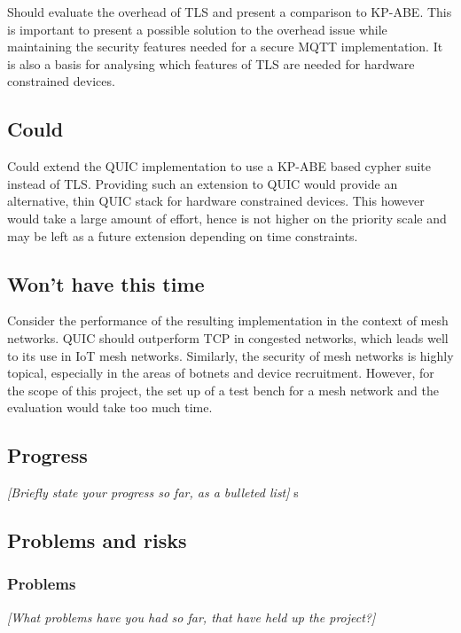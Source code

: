 \documentclass[11pt]{article}
\begin{document}
Should evaluate the overhead of TLS and present a comparison to KP-ABE.
This is important to present a possible solution to the overhead issue while maintaining the security features needed for a secure MQTT implementation.
It is also a basis for analysing which features of TLS are needed for hardware constrained devices.

\subsection*{Could}

Could extend the QUIC implementation to use a KP-ABE based cypher suite instead of TLS.
Providing such an extension to QUIC would provide an alternative, thin QUIC stack for hardware constrained devices.
This however would take a large amount of effort, hence is not higher on the priority scale and may be left as a future extension depending on time constraints.

\subsection*{Won't have this time}

Consider the performance of the resulting implementation in the context of mesh networks.
QUIC should outperform TCP in congested networks, which leads well to its use in IoT mesh networks.
Similarly, the security of mesh networks is highly topical, especially in the areas of botnets and device recruitment.
However, for the scope of this project, the set up of a test bench for a mesh network and the evaluation would take too much time.

\subsection{Progress}\label{progress}

\emph{{[}Briefly state your progress so far, as a bulleted list{]}}
s   
\subsection{Problems and risks}\label{problems-and-risks}

\subsubsection{Problems}\label{problems}

\emph{{[}What problems have you had so far, that have held up the
project?{]}}
\end{document}

